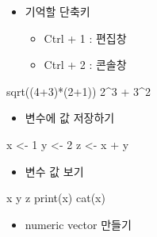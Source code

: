 \documentclass[
]{book}
\newenvironment{Shaded}{\begin{snugshade}}{\end{snugshade}}
\newcommand{\DecValTok}[1]{\textcolor[rgb]{0.00,0.00,0.81}{#1}}
\newcommand{\FunctionTok}[1]{\textcolor[rgb]{0.00,0.00,0.00}{#1}}
\newcommand{\NormalTok}[1]{#1}
\newcommand{\OtherTok}[1]{\textcolor[rgb]{0.56,0.35,0.01}{#1}}
\newcommand{\SpecialCharTok}[1]{\textcolor[rgb]{0.00,0.00,0.00}{#1}}
\providecommand{\tightlist}{%
  \setlength{\itemsep}{0pt}\setlength{\parskip}{0pt}}
\begin{document}
\begin{itemize}
\tightlist
\item
  기억할 단축키

  \begin{itemize}
  \tightlist
  \item
    Ctrl + 1 : 편집창
  \item
    Ctrl + 2 : 콘솔창
  \end{itemize}
\end{itemize}

\begin{Shaded}
\begin{Highlighting}[]
\FunctionTok{sqrt}\NormalTok{((}\DecValTok{4}\SpecialCharTok{+}\DecValTok{3}\NormalTok{)}\SpecialCharTok{*}\NormalTok{(}\DecValTok{2}\SpecialCharTok{+}\DecValTok{1}\NormalTok{))}
\DecValTok{2}\SpecialCharTok{\^{}}\DecValTok{3} \SpecialCharTok{+} \DecValTok{3}\SpecialCharTok{\^{}}\DecValTok{2}
\end{Highlighting}
\end{Shaded}

\begin{itemize}
\tightlist
\item
  변수에 값 저장하기
\end{itemize}

\begin{Shaded}
\begin{Highlighting}[]
\NormalTok{x }\OtherTok{\textless{}{-}} \DecValTok{1}
\NormalTok{y }\OtherTok{\textless{}{-}} \DecValTok{2}
\NormalTok{z }\OtherTok{\textless{}{-}}\NormalTok{ x }\SpecialCharTok{+}\NormalTok{ y}
\end{Highlighting}
\end{Shaded}

\begin{itemize}
\tightlist
\item
  변수 값 보기
\end{itemize}

\begin{Shaded}
\begin{Highlighting}[]
\NormalTok{x}
\NormalTok{y}
\NormalTok{z}
\FunctionTok{print}\NormalTok{(x)}
\FunctionTok{cat}\NormalTok{(x)}
\end{Highlighting}
\end{Shaded}

\begin{itemize}
\tightlist
\item
  numeric vector 만들기
\end{itemize}
\end{document}
